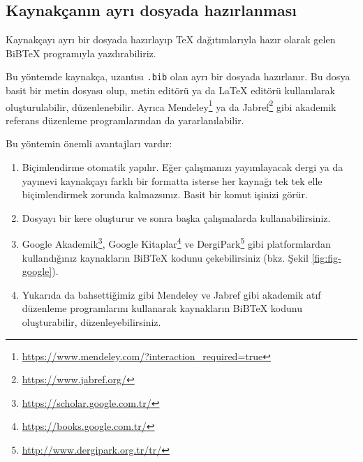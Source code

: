 \documentclass[
  10pt,
]{scrbook}
\providecommand{\tightlist}{%
  \setlength{\itemsep}{0pt}\setlength{\parskip}{0pt}}
\renewcommand{\href}[2]{#2\footnote{\url{#1}}}
\theoremstyle{definition}
\theoremstyle{definition}
\theoremstyle{definition}
\theoremstyle{definition}
\theoremstyle{remark}
\begin{document}
\hypertarget{kaynakuxe7anux131n-ayrux131-dosyada-hazux131rlanmasux131}{%
\subsection{Kaynakçanın ayrı dosyada hazırlanması}\label{kaynakuxe7anux131n-ayrux131-dosyada-hazux131rlanmasux131}}

Kaynakçayı ayrı bir dosyada hazırlayıp TeX
dağıtımlarıyla hazır olarak gelen BiBTeX programıyla yazdırabiliriz.

Bu yöntemde kaynakça, uzantısı \texttt{.bib} olan ayrı bir dosyada hazırlanır.
Bu dosya basit bir metin dosyası olup, metin editörü ya da LaTeX editörü
kullanılarak oluşturulabilir, düzenlenebilir. Ayrıca
\href{https://www.mendeley.com/?interaction_required=true}{Mendeley} ya da
\href{https://www.jabref.org/}{Jabref} gibi akademik referans düzenleme programlarından da
yararlanılabilir.

Bu yöntemin önemli avantajları vardır:

\begin{enumerate}
\def\labelenumi{\arabic{enumi}.}
\tightlist
\item
  Biçimlendirme otomatik yapılır. Eğer çalışmanızı yayımlayacak dergi
  ya da yayınevi kaynakçayı farklı bir formatta isterse her kaynağı
  tek tek elle biçimlendirmek zorunda kalmazsınız. Basit bir komut
  işinizi görür.
\item
  Dosyayı bir kere oluşturur ve sonra başka çalışmalarda
  kullanabilirsiniz.
\item
  \href{https://scholar.google.com.tr/}{Google
  Akademik}, \href{https://books.google.com.tr/}{Google
  Kitaplar} ve
  \href{http://www.dergipark.org.tr/tr/}{DergiPark} gibi platformlardan kullandığınız kaynakların
  BiBTeX kodunu çekebilirsiniz (bkz. Şekil \ref{fig:fig-google}).
\item
  Yukarıda da bahsettiğimiz gibi Mendeley ve Jabref gibi akademik atıf
  düzenleme programlarını kullanarak kaynakların BiBTeX kodunu
  oluşturabilir, düzenleyebilirsiniz.
\end{enumerate}
\end{document}
